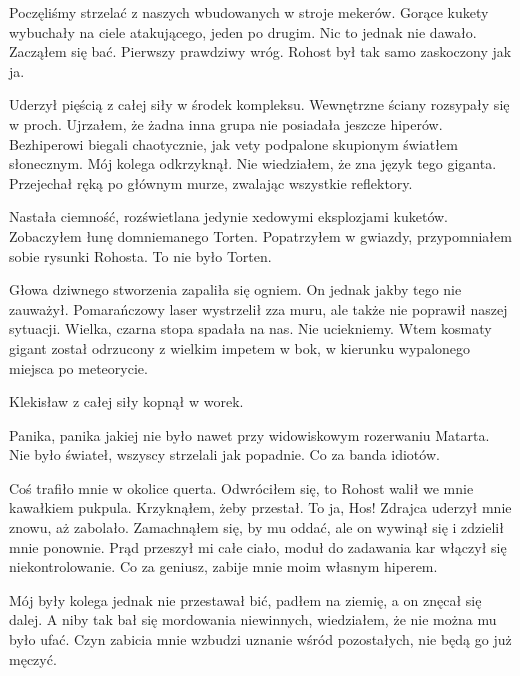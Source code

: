 Poczęliśmy strzelać z naszych wbudowanych w stroje mekerów.
Gorące kukety wybuchały na ciele atakującego, jeden po drugim. Nic to jednak nie dawało.
Zacząłem się bać. Pierwszy prawdziwy wróg. Rohost był tak samo zaskoczony jak ja.

\begin{dialogue}
\ds{}  \dm{} Uderzył pięścią z całej siły w środek kompleksu. 
Wewnętrzne ściany rozsypały się w proch. Ujrzałem, że żadna inna grupa nie posiadała jeszcze hiperów. 
Bezhiperowi biegali chaotycznie, jak vety podpalone skupionym światłem słonecznym.
\ds{}  \dm{} Mój kolega odkrzyknął. Nie wiedziałem, że zna język tego giganta. \dm{} 
\ds{}  \dm{} Przejechał ręką po głównym murze, zwalając wszystkie reflektory. 
\end{dialogue}
Nastała ciemność, rozświetlana jedynie xedowymi eksplozjami kuketów.
Zobaczyłem łunę domniemanego Torten.
Popatrzyłem w gwiazdy, przypomniałem sobie rysunki Rohosta.
To nie było Torten.

Głowa dziwnego stworzenia zapaliła się ogniem.
On jednak jakby tego nie zauważył.
Pomarańczowy laser wystrzelił zza muru, ale także nie poprawił naszej sytuacji.
Wielka, czarna stopa spadała na nas.
Nie uciekniemy.
Wtem kosmaty gigant został odrzucony z wielkim impetem w bok, w kierunku wypalonego miejsca po meteorycie.

\divider{}

Klekisław z całej siły kopnął w worek.

\divider{}

Panika, panika jakiej nie było nawet przy widowiskowym rozerwaniu Matarta.
Nie było świateł, wszyscy strzelali jak popadnie.
Co za banda idiotów.

Coś trafiło mnie w okolice querta.
Odwróciłem się, to Rohost walił we mnie kawałkiem pukpula.
Krzyknąłem, żeby przestał. To ja, Hos!
Zdrajca uderzył mnie znowu, aż zabolało.
Zamachnąłem się, by mu oddać, ale on wywinął się i zdzielił mnie ponownie.
Prąd przeszył mi całe ciało, moduł do zadawania kar włączył się niekontrolowanie. 
Co za geniusz, zabije mnie moim własnym hiperem.

Mój były kolega jednak nie przestawał bić, padłem na ziemię, a on znęcał się dalej.
A niby tak bał się mordowania niewinnych, wiedziałem, że nie można mu było ufać.
Czyn zabicia mnie wzbudzi uznanie wśród pozostałych, nie będą go już męczyć.

